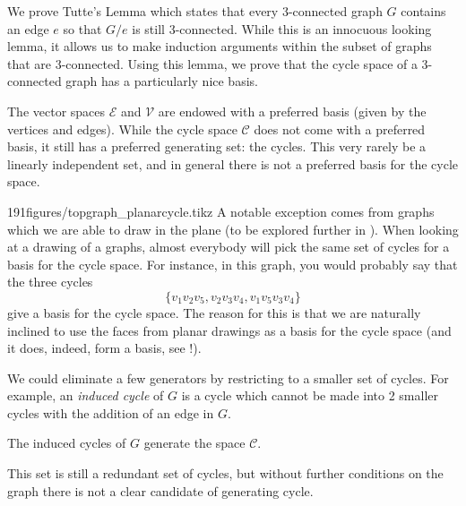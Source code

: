 
\begin{elevator}
We prove Tutte's Lemma which states that every 3-connected graph $G$ contains an edge $e$ so that $G/e$ is still 3-connected. While this is an innocuous looking lemma, it allows us to make induction arguments within the subset of graphs that are 3-connected. Using this lemma, we prove that the cycle space of a 3-connected graph has a particularly nice basis. 
\end{elevator}
\label{sec:graph:3connected}

The vector spaces  $\mathcal E$ and $\mathcal V$ are endowed with a preferred basis (given by the vertices and edges). While the cycle space $\mathcal C$ does not come with a preferred basis,  it still has a preferred generating set: the cycles. This very rarely be a linearly independent set, and in general there is not a preferred basis for the cycle space. 
\begin{examplefigureenv}{191figures/topgraph_planarcycle.tikz}
	A notable exception comes from graphs which we are able to draw in the plane (to be explored further in ). When looking at a drawing of a graphs, almost everybody will pick the same set of cycles for a basis for the cycle space. For instance, in this graph, you would probably say that the three cycles \[\{v_1v_2v_5,v_2v_3v_4, v_1v_5v_3v_4\}\] give a basis for the cycle space. The reason for this is that we are naturally inclined to use the faces from planar drawings as a basis for the cycle space (and it does, indeed, form a basis, see !). 
\end{examplefigureenv}

We could eliminate a few generators by restricting to a smaller set of cycles.  For example, an \emph{induced cycle} of $G$ is a cycle which cannot be made into 2 smaller cycles with the addition of an edge in $G$. 
\begin{claim}
 The induced cycles of $G$ generate the space $\mathcal C$. 
\end{claim}
This set is still a redundant set of cycles, but without further conditions on the graph there is not a clear candidate of generating cycle.

